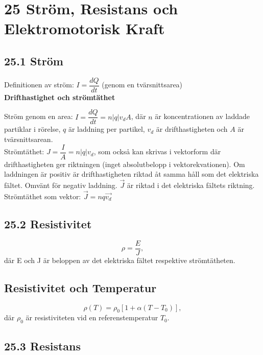 \documentclass[a4paper]{article}
\begin{document}
\section*{25 Ström, Resistans och Elektromotorisk Kraft}

\subsection*{25.1 Ström}

Definitionen av ström: $I = \dfrac{dQ}{dt}$ (genom en tvärsnittsarea)
\\[4mm]

\textbf{Drifthastighet och strömtäthet}

Ström genom en area: $I = \dfrac{dQ}{dt} = n\vert q \vert v_dA$, där $n$ är koncentrationen av laddade partiklar i rörelse, $q$ är laddning per partikel, $v_d$ är drifthastigheten och $A$ är tvärsnittsarean.
\\[2mm]

Strömtäthet: $J = \dfrac{I}{A} = n\vert q \vert v_d$, som också kan skrivas i vektorform där drifthastigheten ger riktningen (inget absolutbelopp i vektorekvationen). Om laddningen är positiv är drifthastigheten riktad åt samma håll som det elektriska fältet. Omvänt för negativ laddning. $\vec{J}$ är riktad i det elektriska fältets riktning.
\\
Strömtäthet som vektor: $\vec{J} =  nq\vec{v_d}$

\subsection*{25.2 Resistivitet}

\begin{equation}
\rho = \dfrac{E}{J}, 
\end{equation}
där E och J är beloppen av det elektriska fältet respektive strömtätheten.

\subsection*{Resistivitet och Temperatur}
\begin{equation}
\rho(T) = \rho_0[1 + \alpha(T - T_0)],
\end{equation}
där $\rho_0$ är resistiviteten vid en referenstemperatur $T_0$.

\subsection*{25.3 Resistans}
\end{document}

